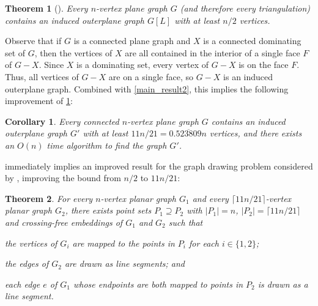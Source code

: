 \documentclass[11pt]{article}
\newtheorem{thm}{Theorem}
\newtheorem{cor}{Corollary}
\theoremstyle{definition}
\begin{document}
\begin{thm}[\cite{angelini.evans.ea:sefe}]
\label{induced_outerplane_orig}
    Every $n$-vertex plane graph $G$ (and therefore every triangulation) contains an induced outerplane graph $G[L]$ with at least $n/2$ vertices.
\end{thm}

Observe that if $G$ is a connected plane graph and $X$ is a connected dominating set of $G$, then the vertices of $X$ are all contained in the interior of a single face $F$ of $G-X$.  Since $X$ is a dominating set, every vertex of $G-X$ is on the face $F$.  Thus, all vertices of $G-X$ are on a single face, so $G-X$ is an induced outerplane graph.
Combined with \cref{main_result2}, this implies the following improvement of \cref{induced_outerplane_orig}:

\begin{cor}\label{induced_outerplane_improved}
    Every connected $n$-vertex plane graph $G$ contains an induced outerplane graph $G'$ with at least $11n/21=0.\overline{523809}n$ vertices, and there exists an $O(n)$ time algorithm to find the graph $G'$.
\end{cor}

 immediately implies an improved result for the graph drawing problem considered by \citet{angelini.evans.ea:sefe}, improving the bound from $n/2$ to $11n/21$:

\begin{thm}\label{sefenomap}
  For every $n$-vertex planar graph $G_1$ and every $\lceil 11n/21\rceil$-vertex planar graph $G_2$, there exists point sets $P_1\supseteq P_2$ with $|P_1|=n$, $|P_2|=\lceil 11n/21\rceil$ and crossing-free embeddings of $G_1$ and $G_2$ such that
  \begin{compactenum}[(a)]
    \item the vertices of $G_i$ are mapped to the points in $P_i$ for each $i\in\{1,2\}$;
    \item the edges of $G_2$ are drawn as line segments; and
    \item each edge $e$ of $G_1$ whose endpoints are both mapped to points in $P_2$ is drawn as a line segment.
  \end{compactenum}
\end{thm}
\end{document}

